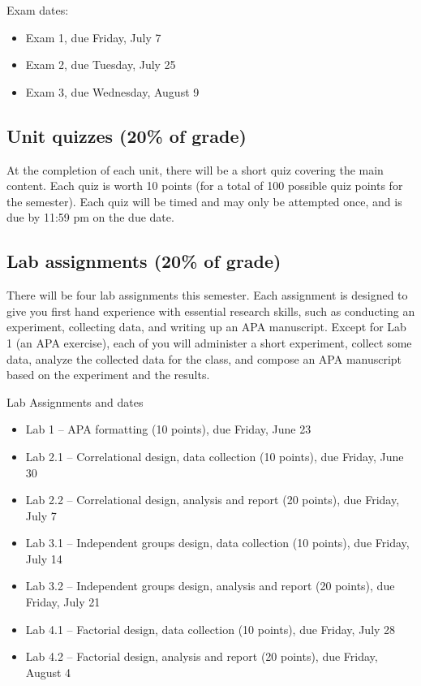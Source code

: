 \documentclass[10pt]{article}
\begin{document}
Exam dates:

\begin{itemize}
\item Exam 1, due Friday, July 7
\item Exam 2, due Tuesday, July 25
\item Exam 3, due Wednesday, August 9
\end{itemize}

\subsection*{Unit quizzes (20\% of grade)}
\label{sec-5-2}

At the completion of each unit, there will be a short quiz covering the main content.  Each quiz is worth 10 points (for a total of 100 possible quiz points for the semester).  Each quiz will be timed and may only be attempted once, and is due by 11:59 pm on the due date.

\subsection*{Lab assignments (20\% of grade)}
\label{sec-5-3}

There will be four lab assignments this semester.  Each assignment is designed to give you first hand experience with essential research skills, such as conducting an experiment, collecting data, and writing up an APA manuscript.  Except for Lab 1 (an APA exercise), each of you will administer a short experiment, collect some data, analyze the collected data for the class, and compose an APA manuscript based on the experiment and the results. 

Lab Assignments and dates

\begin{itemize}
\item Lab 1 – APA formatting (10 points), due Friday, June 23
\item Lab 2.1 – Correlational design, data collection (10 points), due Friday, June 30
\item Lab 2.2 – Correlational design, analysis and report (20 points), due Friday, July 7
\item Lab 3.1 – Independent groups design, data collection (10 points), due Friday, July 14
\item Lab 3.2 – Independent groups design, analysis and report (20 points), due Friday, July 21
\item Lab 4.1 – Factorial design, data collection (10 points), due Friday, July 28
\item Lab 4.2 – Factorial design, analysis and report (20 points), due Friday, August 4
\end{itemize}
\end{document}
